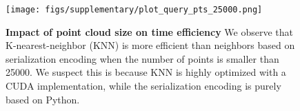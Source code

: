\begin{figure}
  \centering
  \texttt{[image: figs/supplementary/plot\_query\_pts\_25000.png]}
\caption{{\bf Impact of point cloud size on time efficiency} We observe that K-nearest-neighbor (KNN) is more efficient than neighbors based on serialization encoding when the number of points is smaller than 25000. We suspect this is because KNN is highly optimized with a CUDA implementation, while the serialization encoding is purely based on Python.}
\label{fig:knn_serialization_npts}
\end{figure}
